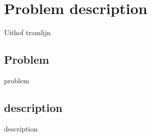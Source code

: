 \section{Problem description}

Uithof tramlijn

\subsection{Problem}
problem

\subsection{description}

description
